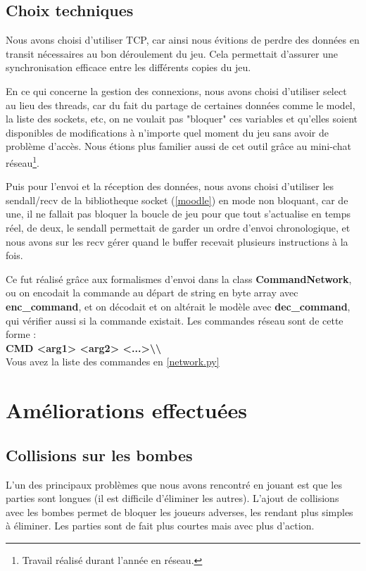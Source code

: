 \documentclass[a4paper]{article}
\begin{document}
		
		
\newpage
		\subsection{Choix techniques}
		Nous avons choisi d'utiliser TCP, car ainsi nous évitions de perdre des données en transit nécessaires au bon déroulement du jeu. Cela permettait d'assurer une synchronisation efficace entre les différents copies du jeu.

		En ce qui concerne la gestion des connexions, nous avons choisi d'utiliser select au lieu des threads, car du fait du partage de certaines données comme le model, la liste des sockets, etc, on ne voulait pas "bloquer" ces variables et qu'elles soient disponibles de modifications à n'importe quel moment du jeu sans avoir de problème d'accès. Nous étions plus familier aussi de cet outil grâce au mini-chat réseau\footnote{Travail réalisé durant l'année en réseau.}.

		Puis pour l'envoi et la réception des données, nous avons choisi d'utiliser les sendall/recv de la bibliotheque socket (\ref{moodle}) en mode non bloquant, car de une, il ne fallait pas bloquer la boucle de jeu pour que tout s'actualise en temps réel, de deux, le sendall permettait de garder un ordre d'envoi chronologique, et nous avons sur les recv gérer quand le buffer recevait plusieurs instructions à la fois.
		
		Ce fut réalisé grâce aux formalismes d'envoi dans la class \textbf{CommandNetwork}, ou on encodait la commande au départ de string en byte array avec \textbf{enc\_command}, et on décodait et on altérait le modèle avec \textbf{dec\_command}, qui vérifier aussi si la commande existait. Les commandes réseau sont de cette forme :\\
		\textbf{CMD <arg1> <arg2> <...>\textbackslash\textbackslash}
		\\

		Vous avez la liste des commandes en \ref{network.py}

	\section{Améliorations effectuées}
		\subsection{Collisions sur les bombes}
		L'un des principaux problèmes que nous avons rencontré en jouant est que les parties sont longues (il est difficile d'éliminer les autres).
		L'ajout de collisions avec les bombes permet de bloquer les joueurs adverses, les rendant plus simples à éliminer.
		Les parties sont de fait plus courtes mais avec plus d'action.
		\\
\end{document}
